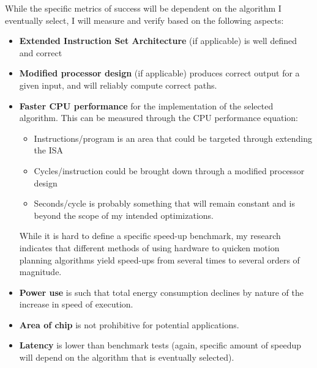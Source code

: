 \documentclass[11pt, oneside]{article}   	%
\begin{document}
While the specific metrics of success will be dependent on the algorithm I eventually select, I will measure and verify based on the following aspects:

\begin{itemize}
    \item \textbf{Extended Instruction Set Architecture} (if applicable) is well defined and correct

    \item \textbf{Modified processor design} (if applicable) produces correct output for a given input, and will reliably compute correct paths.


    \item \textbf{Faster CPU performance} for the implementation of the selected algorithm. This can be measured through the CPU performance equation:
        \begin{itemize}
        \item Instructions/program is an area that could be targeted through extending the ISA
        \item Cycles/instruction could be brought down through a modified processor design
        \item Seconds/cycle is probably something that will remain constant and is beyond the scope of my intended optimizations.
        \end{itemize}
        While it is hard to define a specific speed-up benchmark, my research indicates that different methods of using hardware to quicken motion planning algorithms yield speed-ups from several times to several orders of magnitude.

    \item \textbf{Power use} is such that total energy consumption declines by nature of the increase in speed of execution.

    \item \textbf{Area of chip} is not prohibitive for potential applications.

    \item \textbf{Latency} is lower than benchmark tests (again, specific amount of speedup will depend on the algorithm that is eventually selected).

\end{itemize}
\end{document}

